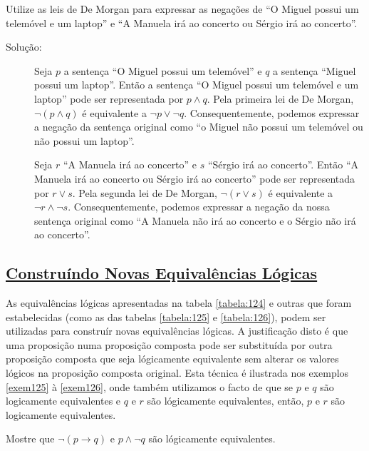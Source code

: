 \begin{exmp}
\label{exem124}
Utilize as leis de De Morgan para expressar as negações de ``O Miguel possui um
telemóvel e um laptop'' e ``A Manuela irá ao concerto ou Sérgio irá ao
concerto''.
\end{exmp}

\begin{description}
\item[Solução: ]Seja $p$ a sentença ``O Miguel possui um telemóvel'' e $q$ a
sentença ``Miguel possui um laptop''. Então a sentença ``O Miguel possui um
telemóvel e um laptop'' pode ser representada por $p \land q$. Pela primeira lei
de De Morgan, $\lnot (p \land q)$ é equivalente a $\lnot p \lor \lnot q$.
Consequentemente, podemos expressar a negação da sentença original como ``o
Miguel não possui um telemóvel ou não possui um laptop''.
\item[]Seja $r$ ``A Manuela irá ao concerto'' e $s$ ``Sérgio irá ao  concerto''.
Então ``A Manuela irá ao concerto ou Sérgio irá ao concerto'' pode ser
representada por $r \lor s$. Pela segunda lei de De Morgan, $\lnot (r \lor s)$ é
equivalente a $\lnot r \land \lnot s$. Consequentemente, podemos expressar a
negação da nossa sentença original como ``A Manuela não irá ao concerto e o
Sérgio não irá ao concerto''.
\end{description}


\subsection*{\underline{Construíndo Novas Equivalências Lógicas}}

As equivalências lógicas apresentadas na tabela \ref{tabela:124} e outras que
foram estabelecidas (como as das tabelas \ref{tabela:125} e \ref{tabela:126}),
podem ser utilizadas para construír novas equivalências lógicas. A justificação
disto é que uma proposição numa proposição composta pode ser substituída por
outra proposição composta que seja lógicamente equivalente sem alterar os
valores lógicos na proposição composta original. Esta técnica é ilustrada nos
exemplos \ref{exem125} à \ref{exem126}, onde também utilizamos o facto de que se
$p$ e $q$ são logicamente equivalentes e $q$ e $r$ são lógicamente equivalentes,
então, $p$ e $r$ são logicamente equivalentes.

\begin{exmp}
\label{exem125}
Mostre que $\lnot (p \to q)$ e $p \land \lnot q$ são lógicamente equivalentes.
\end{exmp}

